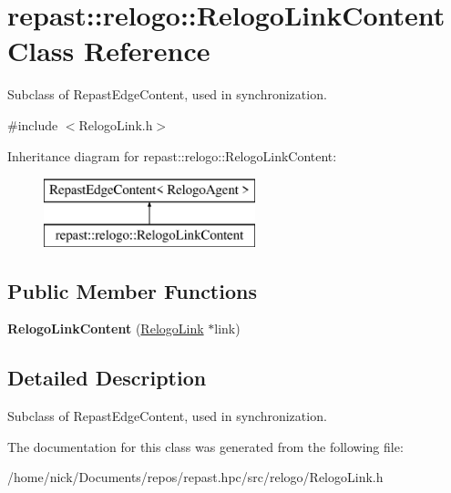 \hypertarget{classrepast_1_1relogo_1_1_relogo_link_content}{\section{repast\-:\-:relogo\-:\-:Relogo\-Link\-Content Class Reference}
\label{classrepast_1_1relogo_1_1_relogo_link_content}
}


Subclass of Repast\-Edge\-Content, used in synchronization.  




{\ttfamily \#include $<$Relogo\-Link.\-h$>$}

Inheritance diagram for repast\-:\-:relogo\-:\-:Relogo\-Link\-Content\-:\begin{figure}[H]
\begin{center}
\leavevmode
\includegraphics[height=2.000000cm]{classrepast_1_1relogo_1_1_relogo_link_content}
\end{center}
\end{figure}
\subsection*{Public Member Functions}
\begin{DoxyCompactItemize}
\item 
\hypertarget{classrepast_1_1relogo_1_1_relogo_link_content_a88617ac84e9e3b94419c0b240414bf59}{{\bfseries Relogo\-Link\-Content} (\hyperlink{classrepast_1_1relogo_1_1_relogo_link}{Relogo\-Link} $\ast$link)}\label{classrepast_1_1relogo_1_1_relogo_link_content_a88617ac84e9e3b94419c0b240414bf59}

\end{DoxyCompactItemize}


\subsection{Detailed Description}
Subclass of Repast\-Edge\-Content, used in synchronization. 

The documentation for this class was generated from the following file\-:\begin{DoxyCompactItemize}
\item 
/home/nick/\-Documents/repos/repast.\-hpc/src/relogo/Relogo\-Link.\-h\end{DoxyCompactItemize}
